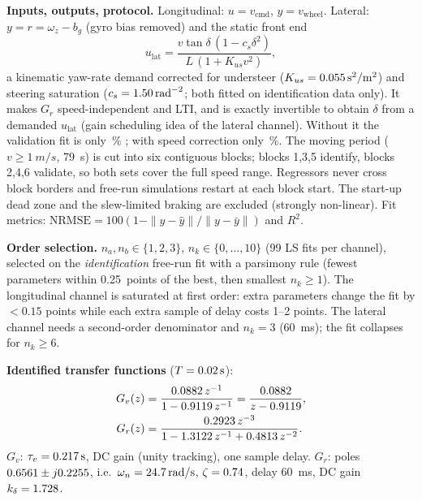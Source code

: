 \documentclass[conference]{IEEEtran}
\begin{document}
\textbf{Inputs, outputs, protocol.} Longitudinal: $u=v_\mathrm{cmd}$, $y=v_\mathrm{wheel}$. Lateral: $y=r=\omega_z-b_g$ (gyro bias removed) and the static front end
\begin{equation}
u_\mathrm{lat}=\frac{v\tan\delta\,(1-c_s\delta^2)}{L\,(1+K_{us}v^2)},
\label{eq:ulat}
\end{equation}
a kinematic yaw-rate demand corrected for understeer ($K_{us}=\SI{0.055}{s^2/m^2}$) and steering saturation ($c_s=\SI{1.50}{rad^{-2}}$; both fitted on identification data only). It makes $G_r$ speed-independent and LTI, and is exactly invertible to obtain $\delta$ from a demanded $u_\mathrm{lat}$ (gain scheduling idea of the lateral channel). Without it the validation fit is only \fitLatBase\,\% ; with speed correction only \fitLatSpeed\,\%.
The moving period ($v\ge\SI{1}{m/s}$, \SI{79}{s}) is cut into six contiguous blocks; blocks 1,3,5 identify, blocks 2,4,6 validate, so both sets cover the full speed range. Regressors never cross block borders and free-run simulations restart at each block start. The start-up dead zone and the slew-limited braking are excluded (strongly non-linear). Fit metrics: $\mathrm{NRMSE}=100(1-\|y-\hat y\|/\|y-\bar y\|)$ and $R^2$.

\textbf{Order selection.} $n_a,n_b\in\{1,2,3\}$, $n_k\in\{0,\dots,10\}$ (99 LS fits per channel), selected on the \emph{identification} free-run fit with a parsimony rule (fewest parameters within \SI{0.25}{points} of the best, then smallest $n_k\ge1$). The longitudinal channel is saturated at first order: extra parameters change the fit by $<0.15$ points while each extra sample of delay costs 1--2 points. The lateral channel needs a second-order denominator and $n_k=3$ (\SI{60}{ms}); the fit collapses for $n_k\ge6$.

\textbf{Identified transfer functions} ($T=\SI{0.02}{s}$):
\begin{align}
G_v(z)&=\frac{0.0882\,z^{-1}}{1-0.9119\,z^{-1}}=\frac{0.0882}{z-0.9119},\label{eq:Gv}\\
G_r(z)&=\frac{0.2923\,z^{-3}}{1-1.3122\,z^{-1}+0.4813\,z^{-2}}.\label{eq:Gr}
\end{align}
$G_v$: $\tau_v=\SI{0.217}{s}$, DC gain \vGdc{} (unity tracking), one sample delay. $G_r$: poles $0.6561\pm j0.2255$, i.e.\ $\omega_n=\SI{24.7}{rad/s}$, $\zeta=0.74$, delay \SI{60}{ms}, DC gain $k_\delta=1.728$.
\end{document}
